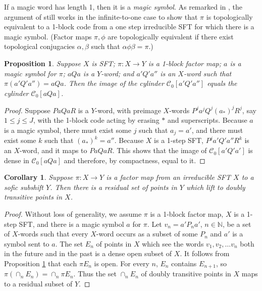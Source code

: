 \documentclass{kepart2010}
\theoremstyle{plain}
\newtheorem{cor}[thm]{Corollary}
\newtheorem{prop}[thm]{Proposition}
\theoremstyle{definition}
\theoremstyle{remark}
\theoremstyle{definition}
\numberwithin{equation}{section}
\begin{document}
If a magic word has length 1, then it is a {\it magic symbol}. As
remarked in \cite[Lemma 2.4]{Boyle2005}, the argument of
\cite[Proposition 4.3.2]{Kitchens1998} still works in the
infinite-to-one case to show that $\pi$ is topologically equivalent
to a 1-block code from a one step irreducible SFT for which there is
a magic symbol. (Factor maps $\pi,\phi$ are topologically equivalent
if there exist topological conjugacies $\alpha,\beta$ such that
$\alpha \phi \beta =\pi$.)

{
\begin{prop} \label{openimage}
Suppose $X$ is
 SFT; $\pi :X\to Y$ is a 1-block factor map;  $a$
is a magic symbol for $\pi$; $aQa$ is a $Y$-word; and $a'Q'a''$ is
an $X$-word such that $\pi (a'Q'a'') = aQa$. Then the image of the
cylinder $\mathcal C_0[a'Q'a'']$ equals the cylinder $\mathcal
C_0[aQa]$.
\end{prop}
\begin{proof}
Suppose $PaQaR$ is a $Y$-word, with preimage $X$-words
$P^ja^jQ^j(a_*)^jR^j$, say $1\leq j\leq J$, with the 1-block code
acting by erasing $*$ and superscripts.
 Because $a$ is a magic symbol,
there must exist some $j$ such that $a_j=a'$, and there must exist
some $k$ such that $(a_*)^k=a''$. Because $X$ is a 1-step SFT,
$P^ja'Q'a''R^k$ is an $X$-word, and it maps to $PaQaR$. This shows
that the image of
 $\mathcal C_0[a'Q'a']$ is dense in
 $\mathcal C_0[aQa]$ and therefore, by compactness,
equal to it.
\end{proof}
}

\begin{cor} \label{cor_open}
Suppose $\pi:X\to Y$ is a factor map from an irreducible SFT $X$ to
a sofic subshift $Y$. Then there is a residual set of points in $Y$
which lift to doubly transitive points in $X$.
\end{cor}
\begin{proof}
Without loss of generality, we  assume $\pi$ is a 1-block factor
map, $X$ is a 1-step SFT, and there is a magic symbol $a$ for $\pi$.
Let $v_n=a'P_na'$, $n\in \mathbb N$, be a set of $X$-words such that
every $X$-word occurs as a subset of some $P_n$ and $a'$ is a symbol
sent to $a$. The set $E_n$ of points in $X$ which see the words
$v_1,v_2,\dots v_n$ both in the future and in the past is a dense
open subset of $X$. It follows from Proposition \ref{openimage} that
each $\pi E_n$ is open. For every $n$,  $E_n$ contains $E_{n+1}$, so
$\pi (\cap_n E_n)=\cap_n \pi E_n$. Thus the set $\cap_n E_n$ of
doubly transitive points in $X$ maps to a residual subset of $Y$.
\end{proof}
\end{document}
